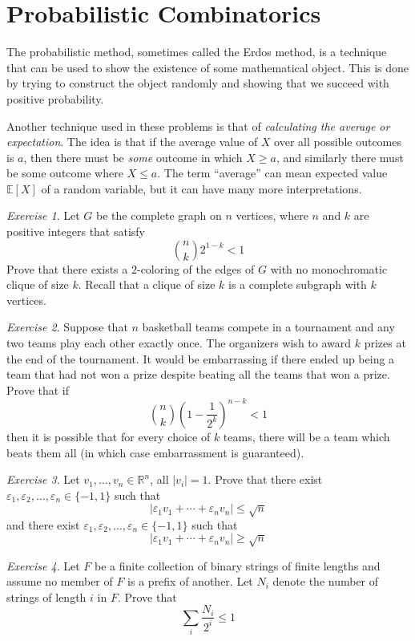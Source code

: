\documentclass{article}
\theoremstyle{definition}
\theoremstyle{remark}
\newtheorem{exercise}{Exercise}
\newcommand{\eps}{\varepsilon}
\newcommand{\EE}{\mathbb{E}}
\newcommand{\RR}{\mathbb{R}}
\newcommand{\geqs}{\geqslant}
\newcommand{\leqs}{\leqslant}
\begin{document}
\section{Probabilistic Combinatorics}

The probabilistic method, sometimes called the Erdos method, is a technique that can be used to show the existence of some mathematical object. This is done by trying to construct the object randomly and showing that we succeed with positive probability.

Another technique used in these problems is that of \emph{calculating the average or expectation}. The idea is that if the average value of $X$ over all possible outcomes is $a$, then there must be \emph{some} outcome in which $X\geqs a$, and similarly there must be some outcome where $X\leqs a$. The term ``average'' can mean expected value $\EE[X]$ of a random variable, but it can have many more interpretations.

\begin{exercise}
Let $G$ be the complete graph on $n$ vertices, where $n$ and $k$ are positive integers that satisfy
\[\binom{n}{k}2^{1-k}<1
\] Prove that there exists a $2$-coloring of the edges of $G$ with no monochromatic clique of size $k$. Recall that a clique of size \(k\) is a complete subgraph with \(k\) vertices.
\end{exercise}

\begin{exercise}
Suppose that $n$ basketball teams compete in a tournament and any two teams play each other exactly once. The organizers wish to award $k$ prizes at the end of the tournament. It would be embarrassing if there ended up being a team that had not won a prize despite beating all the teams that won a prize. Prove that if
\[\binom{n}{k}\left(1-\frac{1}{2^k}\right)^{n-k}<1\] then it is possible that for every choice of $k$ teams, there will be a team which beats them all (in which case embarrassment is guaranteed).
\end{exercise}

\begin{exercise}
Let $v_1,\dots,v_n\in \RR^n$, all $|v_i|=1$. Prove that there exist $\eps_1,\eps_2,\dots,\eps_n\in \{-1,1\}$ such that 
\[|\eps_1v_1+\cdots+\eps_nv_n|\leqs \sqrt{n}\]
and there exist $\eps_1,\eps_2,\dots,\eps_n\in \{-1,1\}$ such that
\[|\eps_1v_1+\cdots+\eps_nv_n|\geqs \sqrt{n}\]
\end{exercise}

\begin{exercise}
Let $F$ be a finite collection of binary strings of finite lengths and assume no member of $F$ is a prefix of another. Let $N_i$ denote the number of strings of length $i$ in $F$. Prove that \[\sum_i \frac{N_i}{2^i}\leqs 1\]
\end{exercise}
\end{document}

